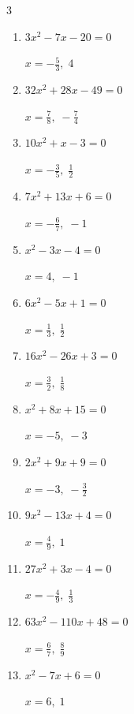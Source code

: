 \begin{multicols}{3}
\begin{enumerate}
  \item $3x^{2}-7x-20=0$

        $\displaystyle x=-\frac{5}{3},\; 4$

  \item $32x^{2}+28x-49=0$

        $\displaystyle x=\frac{7}{8},\; -\frac{7}{4}$

  \item $10x^{2}+x-3=0$

        $\displaystyle x=-\frac{3}{5},\; \frac{1}{2}$

  \item $7x^{2}+13x+6=0$

        $\displaystyle x=-\frac{6}{7},\; -1$

  \item $x^{2}-3x-4=0$

        $\displaystyle x=4,\; -1$

  \item $6x^{2}-5x+1=0$

        $\displaystyle x=\frac{1}{3},\; \frac{1}{2}$

  \item $16x^{2}-26x+3=0$

        $\displaystyle x=\frac{3}{2},\; \frac{1}{8}$

  \item $x^{2}+8x+15=0$

        $\displaystyle x=-5,\; -3$

\columnbreak %

\resetques

  \item $2x^{2}+9x+9=0$

        $\displaystyle x=-3,\; -\frac{3}{2}$

  \item $9x^{2}-13x+4=0$

        $\displaystyle x=\frac{4}{9},\; 1$

  \item $27x^{2}+3x-4=0$

        $\displaystyle x=-\frac{4}{9},\; \frac{1}{3}$

  \item $63x^{2}-110x+48=0$

        $\displaystyle x=\frac{6}{7},\; \frac{8}{9}$

  \item $x^{2}-7x+6=0$

        $\displaystyle x=6,\; 1$


\end{enumerate}
\end{multicols}
